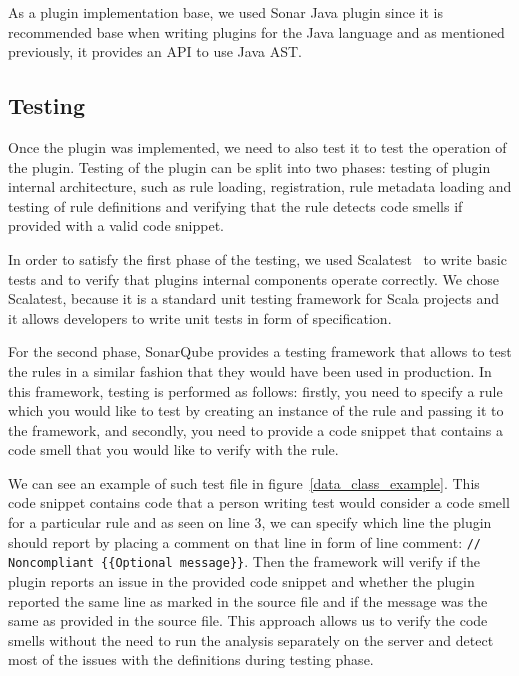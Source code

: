 As a plugin implementation base, we used Sonar Java plugin since it is recommended
base when writing plugins for the Java language and as mentioned previously, it provides
an API to use Java AST\@.

\subsection{Testing}\label{subsec:testing}


Once the plugin was implemented, we need to also test it to test the operation of the plugin.
Testing of the plugin can be split into two phases: testing of plugin internal architecture, such as
rule loading, registration, rule metadata loading and testing of rule definitions and verifying that
the rule detects code smells if provided with a valid code snippet.

In order to satisfy the first phase of the testing, we used Scalatest~\cite{scalatest} to write basic tests and to verify
that plugins internal components operate correctly.
We chose Scalatest, because it is a standard unit testing framework for Scala projects and it allows developers
to write unit tests in form of specification.

For the second phase, SonarQube provides a testing framework that allows to test the rules in a similar fashion that
they would have been used in production.
In this framework, testing is performed as follows: firstly, you need to specify a rule which you would like to test by
creating an instance of the rule and passing it to the framework, and secondly, you need to provide a code snippet that
contains a code smell that you would like to verify with the rule.

We can see an example of such test file in figure~\ref{data_class_example}.
This code snippet contains code that a person writing test would consider a code smell for a particular rule
and as seen on line 3, we can specify which line the plugin should report by placing a comment on that line in form of line comment:
\verb|// Noncompliant {{Optional message}}|.
Then the framework will verify if the plugin reports an issue in the provided code snippet and whether the plugin reported
the same line as marked in the source file and if the message was the same as provided in the source file.
This approach allows us to verify the code smells without the need to run the analysis separately on the server and
detect most of the issues with the definitions during testing phase.

